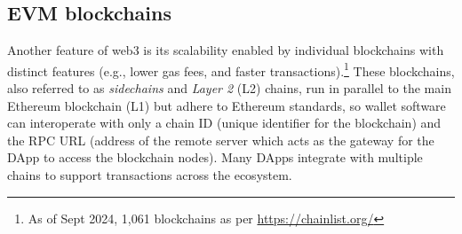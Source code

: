 \documentclass[conference]{IEEEtran}
\begin{document}
\subsection{\ac*{EVM} blockchains}
Another feature of web3 is its scalability enabled by individual blockchains with distinct features (e.g., lower gas fees, and faster transactions).\footnote{As of Sept 2024, 1,061 blockchains as per \url{https://chainlist.org/}} %
These blockchains, also referred to as \textit{sidechains} and \textit{Layer 2} (L2) chains, run in parallel to the main Ethereum blockchain (L1) but adhere to Ethereum standards, so wallet software can interoperate with only a chain ID (unique identifier for the blockchain) and the \ac*{RPC} URL (address of the remote server which acts as the gateway for the DApp to access the blockchain nodes).
Many DApps integrate with multiple chains to support transactions across the ecosystem.
\end{document}
